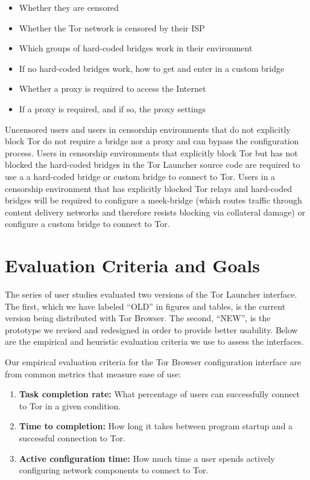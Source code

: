 \documentclass[USenglish,oneside,twocolumn]{article}
\begin{document}
\begin{itemize}
	\item{Whether they are censored} 
	\item{Whether the Tor network is censored by their ISP}
	\item{Which groups of hard-coded bridges work in their environment} 
	\item{If no hard-coded bridges work, how to get and enter in a custom bridge} 
	\item{Whether a proxy is required to access the Internet}
	\item{If a proxy is required, and if so, the proxy settings}
\end{itemize}

Uncensored users and users in censorship environments that do not explicitly 
block Tor do not require a bridge nor a proxy and can bypass the configuration process.
Users in censorship environments that explicitly block Tor but has not blocked the 
hard-coded bridges in the Tor Launcher source code are required to use a 
a hard-coded bridge or custom bridge to connect to Tor. Users in a censorship environment that has explicitly 
blocked Tor relays and hard-coded bridges will be required to configure a meek-bridge (which 
routes traffic through content delivery networks and therefore resists blocking via collateral damage) or 
configure a custom bridge to connect to Tor.


\section{Evaluation Criteria and Goals}
\label{sec:goals}
The series of user studies evaluated two versions of the Tor Launcher interface.
The first, which we have labeled ``OLD'' in figures and tables,
is the current version being distributed with Tor Browser.
The second, ``NEW'', is the prototype we revised and redesigned
in order to provide better usability. Below are the empirical and 
heuristic evaluation criteria we use to assess the interfaces. 

Our empirical evaluation criteria for the Tor Browser configuration
interface are from common metrics that measure ease of use: \\

\begin{enumerate}
    \item {\bfseries Task completion rate:} What percentage of users can successfully connect to Tor in a given condition.
    \item {\bfseries  Time to completion:} How long it takes between program startup and a successful connection to Tor.
    \item {\bfseries Active configuration time:} How much time a user spends actively configuring network components to connect to Tor. 
\end{enumerate}
\end{document}
